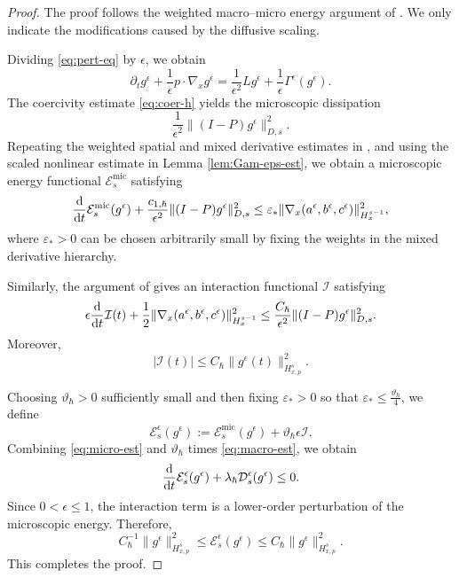 \documentclass[10pt,reqno]{amsart}
\numberwithin{equation}{section}
\newcommand{\lt}{\left}
\newcommand{\rt}{\right}
\newcommand{\bq}{\begin{equation}}
\newcommand{\eq}{\end{equation}}
\newcommand{\pa}{\partial}
\newcommand{\calD}{\mathcal D}
\newcommand{\calE}{\mathcal E}
\newcommand{\calI}{\mathcal I}
\newcommand{\rdt}{\textnormal{d}t}
\begin{document}
 
 
\begin{proof}
The proof follows the weighted macro--micro energy argument of
\cite[Lemma 5.8]{CHHpre}. We only indicate the modifications caused by the diffusive scaling.

Dividing \eqref{eq:pert-eq} by $\epsilon$, we obtain
\[
\pa_tg^\epsilon+\frac{1}{\epsilon}p\cdot\nabla_xg^\epsilon=\frac{1}{\epsilon^2}L  g^\epsilon+\frac{1}{\epsilon}\Gamma^\epsilon(g^\epsilon).
\]
The coercivity estimate \eqref{eq:coer-h} yields the microscopic dissipation
\[
\frac{1}{\epsilon^2} \| (I-P)g^\epsilon \|_{D,s}^2.
\]
Repeating the weighted spatial and mixed derivative estimates in
\cite[Lemmas 5.2 and 5.3]{CHHpre}, and using the scaled nonlinear estimate
in Lemma \ref{lem:Gam-eps-est}, we obtain a microscopic energy functional
$\calE^\mathrm{mic}_s$ satisfying
\bq\label{eq:micro-est}
\frac{\rm d}{\rdt} \calE^\mathrm{mic}_s ( g^\epsilon ) + \frac{c_{1,\hbar}}{\epsilon^2} \| (I-P)g^\epsilon \|_{D,s}^2 \le \varepsilon_* \| \nabla_x ( a^\epsilon, b^\epsilon, c^\epsilon ) \|_{H^{s-1}_x}^2,
\eq
where $\varepsilon_*>0$ can be chosen arbitrarily small by fixing the weights in the mixed derivative hierarchy.

Similarly, the argument of \cite[Lemma 5.7]{CHHpre} gives an interaction functional $\calI$ satisfying
\bq\label{eq:macro-est}
\epsilon \frac{\rm d}{\rdt} \calI(t) + \frac{1}{2} \| \nabla_x ( a^\epsilon, b^\epsilon, c^\epsilon ) \|_{H^{s-1}_x}^2 \le \frac{C_\hbar}{\epsilon^2} \| (I-P)g^\epsilon \|_{D,s}^2.
\eq
Moreover,
\[
\lt| \calI(t) \rt| \le C_\hbar \| g^\epsilon(t) \|_{H^s_{x,p}}^2.
\]

Choosing $\vartheta_\hbar>0$ sufficiently small and then fixing
$\varepsilon_*>0$ so that $\varepsilon_* \le \frac{\vartheta_\hbar}{4}$, we define
\[
\calE^\epsilon_s ( g^\epsilon ) := \calE^\mathrm{mic}_s ( g^\epsilon ) + \vartheta_\hbar \epsilon \calI.
\]
Combining \eqref{eq:micro-est} and $\vartheta_\hbar$ times \eqref{eq:macro-est}, we obtain
\[
\frac{\rm d}{\rdt} \calE^\epsilon_s ( g^\epsilon ) + \lambda_\hbar \calD^\epsilon_s ( g^\epsilon ) \le 0.
\]
Since $0<\epsilon\le1$, the interaction term is a lower-order perturbation of the microscopic energy. Therefore,
\[
C_\hbar^{-1} \| g^\epsilon \|_{H^s_{x,p}}^2 \le \calE^\epsilon_s ( g^\epsilon ) \le C_\hbar \| g^\epsilon \|_{H^s_{x,p}}^2.
\]
This completes the proof.
\end{proof}
 

 
\end{document}
